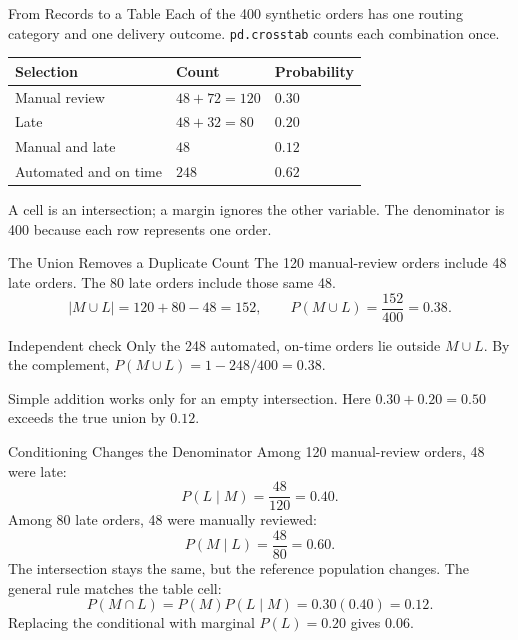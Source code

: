 \documentclass[aspectratio=169,10pt,english]{beamer}
\begin{document}
\begin{frame}{From Records to a Table}
  \small
  Each of the 400 synthetic orders has one routing category and one delivery
  outcome. \texttt{pd.crosstab} counts each combination once.
  \begin{center}
    \begin{tabular}{lll}
      \toprule
      Selection & Count & Probability\\
      \midrule
      Manual review & \(48+72=120\) & \(0.30\)\\
      Late & \(48+32=80\) & \(0.20\)\\
      Manual and late & \(48\) & \(0.12\)\\
      Automated and on time & \(248\) & \(0.62\)\\
      \bottomrule
    \end{tabular}
  \end{center}
  A cell is an intersection; a margin ignores the other variable.
  The denominator is 400 because each row represents one order.
\end{frame}

\begin{frame}{The Union Removes a Duplicate Count}
  \small
  The 120 manual-review orders include 48 late orders. The 80 late orders
  include those same 48.
  \[
    |M\cup L|=120+80-48=152,\qquad
    P(M\cup L)=\frac{152}{400}=0.38.
  \]
  \begin{block}{Independent check}
    Only the 248 automated, on-time orders lie outside \(M\cup L\).
    By the complement, \(P(M\cup L)=1-248/400=0.38\).
  \end{block}
  Simple addition works only for an empty intersection. Here
  \(0.30+0.20=0.50\) exceeds the true union by \(0.12\).
\end{frame}

\begin{frame}{Conditioning Changes the Denominator}
  \small
  Among 120 manual-review orders, 48 were late:
  \[
    P(L\mid M)=\frac{48}{120}=0.40.
  \]
  Among 80 late orders, 48 were manually reviewed:
  \[
    P(M\mid L)=\frac{48}{80}=0.60.
  \]
  The intersection stays the same, but the reference population changes.
  The general rule matches the table cell:
  \[
    P(M\cap L)=P(M)P(L\mid M)=0.30(0.40)=0.12.
  \]
  Replacing the conditional with marginal \(P(L)=0.20\) gives \(0.06\).
\end{frame}
\end{document}
